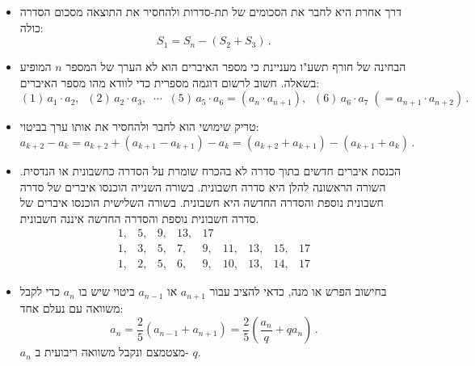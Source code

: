 \begin{itemize}
\item 
דרך אחרת היא לחבר את הסכומים של תת-סדרות ולהחסיר את התוצאה מסכום הסדרה כולה:
\[
S_1 = S_n - (S_2+S_3)\,.
\]
\vspace{-6ex}

\item
הבחינה של חורף תשע"ו מעניינת כי מספר האיברים הוא לא הערך של המספר 
$n$
המופיע בשאלה. חשוב לרשום דוגמה מספרית כדי לוודא מהו מספר האיברים:
\[
(1)\, a_1\cdot a_2,\;\; (2)\,a_2\cdot a_3,\;\;\cdots\;\; (5)\,a_5\cdot a_6=(a_n\cdot a_{n+1}),\;\; (6)\,a_6\cdot a_7 \;(= a_{n+1}\cdot a_{n+2})\,.
\]

\np

\item
טריק שימושי הוא לחבר ולהחסיר את אותו ערך בביטוי:
\[
a_{k+2} - a_{k} = a_{k+2}+(a_{k+1}-a_{k+1})-a_{k} = (a_{k+2}+a_{k+1})-(a_{k+1}+a_{k})\,.
\]
\vspace{-4ex}

\item
הכנסת איברים חדשים בתוך סדרה לא בהכרח שומרת על הסדרה כחשבונית או הנדסית. השורה הראשונה להלן היא סדרה חשבונית. בשורה השנייה הוכנסו איברים של סדרה חשבונית נוספת והסדרה החדשה היא חשבונית. בשורה השלישית הוכנסו איברים של סדרה חשבונית נוספת והסדרה החדשה איננה חשבונית.
\[
\begin{array}{rrrrrrrrrrrrr}
1,& 5,& 9,& 13,& 17\\
1, &3,& 5,&7,& 9,& 11,& 13, &15, & 17\\
1, &2,& 5,&6,& 9,& 10,& 13, &14, & 17
\end{array}
\]
\item
בחישוב הפרש או מנה, כדאי להציב עבור
$a_{n+1}$
או
$a_{n-1}$
ביטוי שיש בו 
$a_n$
כדי לקבל משוואה עם נעלם אחד:
\[
a_n = \frac{2}{5}(a_{n-1}+a_{n+1}) =\frac{2}{5}\left(\frac{a_n}{q}+qa_n\right)\,.
\]
$a_n$
מצטמצם ונקבל משוואה ריבועית ב-%
$q$.

\end{itemize}

\npchap
